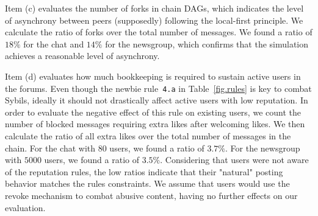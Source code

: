 \documentclass[10pt,journal,compsoc]{IEEEtran}
\newcommand{\code}[1]  {\texttt{\footnotesize{#1}}}
\begin{document}
Item (c) evaluates the number of forks in chain DAGs, which indicates the level
of asynchrony between peers (supposedly) following the local-first principle.
We calculate the ratio of forks over the total number of messages.
We found a ratio of $18\%$ for the chat and $14\%$ for the newsgroup, which
confirms that the simulation achieves a reasonable level of asynchrony.

Item (d) evaluates how much bookkeeping is required to sustain active users in
the forums.
Even though the newbie rule~\code{4.a} in Table~\ref{fig.rules} is key to
combat Sybils, ideally it should not drastically affect active users with low
reputation.
%
In order to evaluate the negative effect of this rule on existing users, we
count the number of blocked messages requiring extra likes after welcoming
likes.
We then calculate the ratio of all extra likes over the total number of
messages in the chain.
%
For the chat with $80$ users, we found a ratio of $3.7\%$.
For the newsgroup with $5000$ users, we found a ratio of $3.5\%$.
%
Considering that users were not aware of the reputation rules, the low ratios
indicate that their "natural" posting behavior matches the rules constraints.
%
We assume that users would use the revoke mechanism to combat abusive content,
having no further effects on our evaluation.
\end{document}
